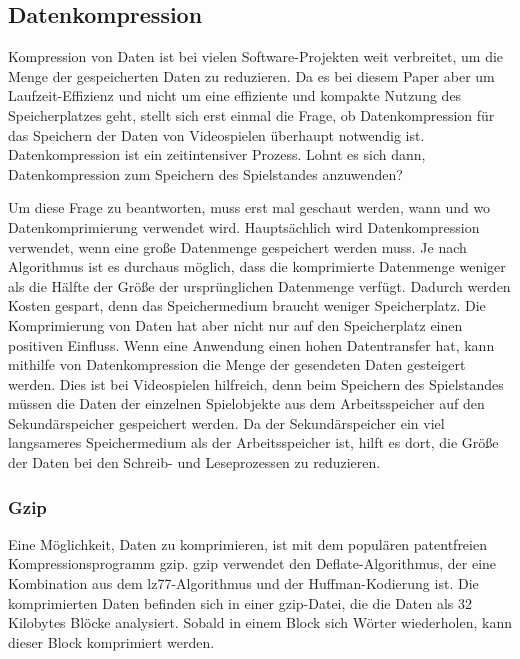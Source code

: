 \subsection{Datenkompression} \label{ssec:kompression}
Kompression von Daten ist bei vielen Software-Projekten weit verbreitet, um die Menge der gespeicherten Daten zu reduzieren. Da es bei diesem Paper aber um Laufzeit-Effizienz und nicht um eine effiziente und kompakte Nutzung des Speicherplatzes geht, stellt sich erst einmal die Frage, ob Datenkompression für das Speichern der Daten von Videospielen überhaupt notwendig ist. Datenkompression ist ein zeitintensiver Prozess. Lohnt es sich dann, Datenkompression zum Speichern des Spielstandes anzuwenden? 

Um diese Frage zu beantworten, muss erst mal geschaut werden, wann und wo Datenkomprimierung verwendet wird. Hauptsächlich wird Datenkompression verwendet, wenn eine große Datenmenge gespeichert werden muss. Je nach Algorithmus ist es durchaus möglich, dass die komprimierte Datenmenge weniger als die Hälfte der Größe der ursprünglichen Datenmenge verfügt. Dadurch werden Kosten gespart, denn das Speichermedium braucht weniger Speicherplatz. Die Komprimierung von Daten hat aber nicht nur auf den Speicherplatz einen positiven Einfluss. Wenn eine Anwendung einen hohen Datentransfer hat, kann mithilfe von Datenkompression die Menge der gesendeten Daten gesteigert werden. Dies ist bei Videospielen hilfreich, denn beim Speichern des Spielstandes müssen die Daten der einzelnen Spielobjekte aus dem Arbeitsspeicher auf den Sekundärspeicher gespeichert werden. Da der Sekundärspeicher ein viel langsameres Speichermedium als der Arbeitsspeicher ist, hilft es dort, die Größe der Daten bei den Schreib- und Leseprozessen zu reduzieren.\cite{mediumWhenDataCompression}

\subsubsection{Gzip}

Eine Möglichkeit, Daten zu komprimieren, ist mit dem populären patentfreien Kompressionsprogramm \ac{gzip}. \ac{gzip} verwendet den Deflate-Algorithmus, der eine Kombination aus dem \ac{lz77}-Algorithmus und der Huffman-Kodierung ist. Die komprimierten Daten befinden sich in einer \ac{gzip}-Datei, die die Daten als 32 Kilobytes Blöcke analysiert. Sobald in einem Block sich Wörter wiederholen, kann dieser Block komprimiert werden. \cite{gnuGzip}\cite{1414952}\cite{seobilityGzipFunktioniert}

